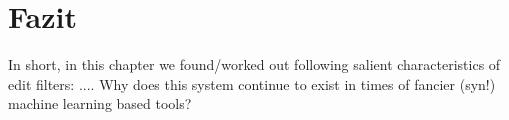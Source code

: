 \section{Fazit}

In short, in this chapter we found/worked out following salient characteristics of edit filters: ....
Why does this system continue to exist in times of fancier (syn!) machine learning based tools?


